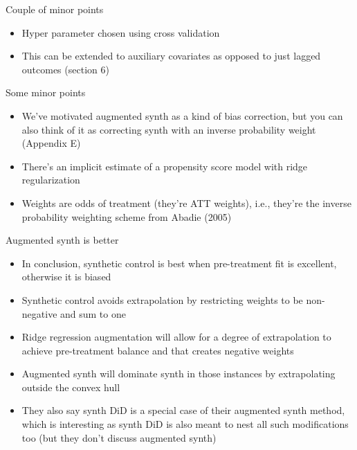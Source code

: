 \documentclass{beamer}
\begin{document}


\begin{frame}{Couple of minor points}

\begin{itemize}
\item Hyper parameter chosen using cross validation
\item This can be extended to auxiliary covariates as opposed to just lagged outcomes (section 6)
\end{itemize}

\end{frame}



\begin{frame}{Some minor points}

\begin{itemize}
\item We've motivated augmented synth as a kind of bias correction, but you can also think of it as correcting synth with an inverse probability weight (Appendix E)
\item There's an implicit estimate of a propensity score model with ridge regularization
\item Weights are odds of treatment (they're ATT weights), i.e., they're the inverse probability weighting scheme from Abadie (2005)
\end{itemize}

\end{frame}


\begin{frame}{Augmented synth is better}

\begin{itemize}
\item In conclusion, synthetic control is best when pre-treatment fit is excellent, otherwise it is biased
\item Synthetic control avoids extrapolation by restricting weights to be non-negative and sum to one
\item Ridge regression augmentation will allow for a degree of extrapolation to achieve pre-treatment balance and that creates negative weights
\item Augmented synth will dominate synth in those instances by extrapolating outside the convex hull
\item They also say synth DiD is a special case of their augmented synth method, which is interesting as synth DiD is also meant to nest all such modifications too (but they don't discuss augmented synth)
\end{itemize}

\end{frame}
\end{document}
